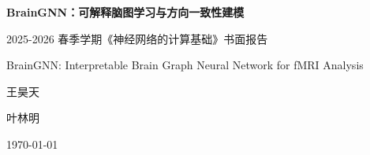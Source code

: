 \begin{titlepage}
  \centering
  \vspace*{2.8cm}
  {\bfseries BrainGNN：可解释脑图学习与方向一致性建模\par}
  \vspace{1.0cm}
  {2025-2026 春季学期《神经网络的计算基础》书面报告\par}
  \vspace{0.4cm}
  {BrainGNN: Interpretable Brain Graph Neural Network for fMRI Analysis\par}
  \vfill
  {王昊天\par}
  \vspace{0.4cm}
  {叶林明\par}
  \vfill
  {\large \today\par}
\end{titlepage}

